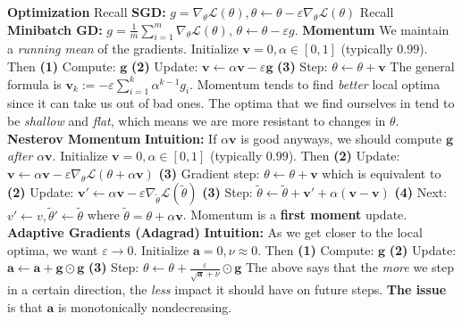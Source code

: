 \documentclass{article}
\renewcommand{\v}{\bf{v}}
\renewcommand{\a}{\bf{a}}
\newcommand{\g}{\bf{g}}
\newcommand{\ot}{\leftarrow}
\renewcommand{\bf}[1]{\textbf{{#1}}}
\renewcommand{\it}[1]{\textit{{#1}}}
\newcommand{\grad}[2]{\nabla_{#1}{#2}}
\newcommand{\eps}{\varepsilon}
\renewcommand{\L}{\mathcal{L}}
\begin{document}
\begin{small}
\bf{Optimization}
\newline
Recall \bf{SGD:} 
$g = \grad{\theta}{\L(\theta)}, \theta \ot \theta - \eps \grad{\theta}{\L(\theta)}$ 
\newline
Recall \bf{Minibatch GD:} 
$g = \frac{1}{m} \sum_{i = 1}^{m} \grad{\theta}{\L(\theta)}$, $\theta \ot \theta - \eps g$.
\newline
\bf{Momentum} 
\newline
We maintain a \it{running mean} of the gradients. 
Initialize $\v = 0, \alpha \in [0, 1]$ (typically $0.99$). Then
\bf{(1)} Compute: $\g$
\bf{(2)} Update: $\v \ot \alpha \v - \eps \g$
\bf{(3)} Step: $\theta \ot \theta + \v$
\newline
The general formula is $\v_{k} := -\eps \sum_{i = 1}^{k} \alpha^{k - 1} g_i$.
\newline
Momentum tends to find \it{better} local optima since it can take us out of bad ones. The optima
that we find ourselves in tend to be \it{shallow} and \it{flat}, which means we are more resistant
to changes in $\theta$.
\bf{Nesterov Momentum}
\newline
\bf{Intuition:} If $\alpha \v$ is good anyways, we should compute $\g$ \it{after} $\alpha \v$.
Initialize $\v = 0, \alpha \in [0, 1]$ 
(typically $0.99$). Then
\newline
\bf{(2)} Update: $\v \ot \alpha \v - \eps \grad{\theta}{\L(\theta + \alpha \v)}$
\bf{(3)} Gradient step: $\theta \ot \theta + \v$
\newline
which is equivalent to
\newline
\bf{(2)} Update: $\v' \ot \alpha \v - \eps \grad{\widetilde{\theta}}{\L(\widetilde{\theta})}$
\bf{(3)} Step: $\widetilde{\theta} \ot \widetilde{\theta} + \v' + \alpha(\v - \v)$
\bf{(4)} Next: $v' \ot v, \widetilde{\theta}' \ot \widetilde{\theta}$
where
$\widetilde{\theta} = \theta + \alpha \v$.
Momentum is a \bf{first moment} update.
\newline
\bf{Adaptive Gradients (Adagrad)}
\newline
\bf{Intuition:} As we get closer to the local optima, we want $\eps \to 0$. Initialize 
$\a = 0, \nu \approx 0$. Then
\newline
\bf{(1)} Compute: $\g$
\bf{(2)} Update: $\a \ot \a + \g \odot \g$
\bf{(3)} Step: $\theta \ot \theta + \frac{\eps}{\sqrt{\a} + \nu} \odot \g$
\newline
The above says that the \it{more} we step in a certain direction, the \it{less} impact it should
have on future steps.
\bf{The issue} is that $\a$ is monotonically nondecreasing.

\end{small}
\end{document}
